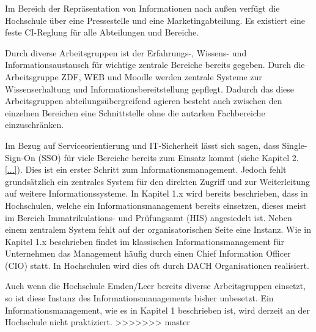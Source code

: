 Im Bereich der Repräsentation von Informationen nach außen verfügt die Hochschule über eine Pressestelle und eine Marketingabteilung. Es existiert eine feste CI-Reglung für alle Abteilungen und Bereiche. 

Durch diverse Arbeitsgruppen ist der Erfahrungs-, Wissens- und Informationsaustausch für wichtige zentrale Bereiche bereits gegeben. Durch die Arbeitsgruppe ZDF, WEB und Moodle werden zentrale Systeme zur Wissenserhaltung und Informationsbereitstellung gepflegt. Dadurch das diese Arbeitsgruppen abteilungsübergreifend agieren besteht auch zwischen den einzelnen Bereichen eine Schnittstelle ohne die autarken Fachbereiche einzuschränken. 

Im Bezug auf Serviceorientierung und IT-Sicherheit lässt sich sagen, dass Single-Sign-On (SSO) für viele Bereiche bereits zum Einsatz kommt (siehe Kapitel 2. \ref{...}). Dies ist ein erster Schritt zum Informationsmanagement. Jedoch fehlt grundsätzlich ein zentrales System für den direkten Zugriff und zur Weiterleitung auf weitere Informationssysteme. In Kapitel 1.x wird bereits beschrieben, dass in Hochschulen, welche ein Informationsmanagement bereits einsetzen, dieses meist im Bereich Immatrikulations- und Prüfungsamt (HIS) angesiedelt ist. 
Neben einem  zentralem System fehlt auf der organisatorischen Seite eine Instanz. Wie in Kapitel 1.x beschrieben findet im klassischen Informationsmanagement für Unternehmen das Management häufig durch einen Chief Information Officer (CIO) statt. In Hochschulen wird dies oft durch DACH Organisationen realisiert. 

Auch wenn die Hochschule Emden/Leer bereits diverse Arbeitsgruppen einsetzt, so ist diese Instanz des Informationsmanagements bisher unbesetzt. Ein Informationsmanagement, wie es in Kapitel 1 beschrieben ist, wird derzeit an der Hochschule nicht praktiziert. 
>>>>>>> master
